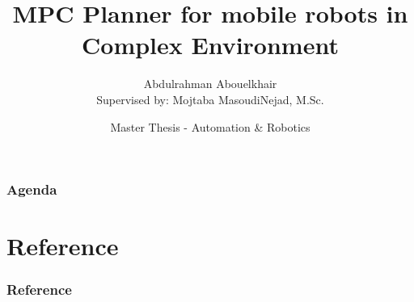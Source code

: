 \documentclass[aspectratio=1610, professionalfonts, 9pt]{beamer}
\title[MPC-Planner]{MPC Planner for mobile robots in Complex Environment}
\author[A.~Abouelkhair]{Abdulrahman Abouelkhair\\ Supervised by: Mojtaba MasoudiNejad, M.Sc.}
\institute[FLW]{\small Lehrstuhl für Förder- und Lagerwesen \\  Fakultät Maschinenbau}
\date[SoSe 2019]{Master Thesis - Automation \& Robotics}
\begin{document}
\maketitle

\begin{frame}
    \frametitle{Agenda}
    \tableofcontents
\end{frame}



%


%


%









\section{Reference}
	\begin{frame}[allowframebreaks]
		\frametitle{Reference}
		\printbibliography
	\end{frame}
\end{document}
